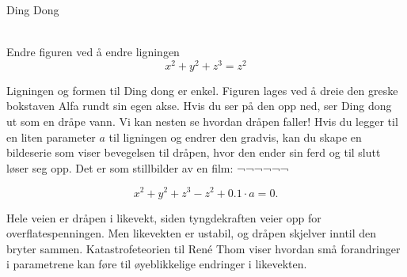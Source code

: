 \documentclass[no]{./../../common/SurferDesc}%
\begin{document}
\footnotesize

\begin{surferPage}
  \begin{surferTitle}Ding Dong\end{surferTitle}  \\
Endre figuren ved å endre ligningen\\

\smallskip
\[x^2	+ y^2	+ z^3	= z^2\]

\singlespacing
Ligningen og formen til Ding dong er enkel. Figuren lages ved å dreie den greske bokstaven Alfa rundt sin egen akse. Hvis du ser på den opp ned, ser Ding dong ut som en dråpe vann. Vi kan nesten se hvordan dråpen faller! 
\newline
Hvis du legger til en liten parameter $a$ til ligningen og endrer den gradvis, kan du skape en bildeserie som viser bevegelsen til dråpen, hvor den ender sin ferd og til slutt løser seg opp. Det er som stillbilder av en film:
¬¬¬¬¬¬

\[x^2	+ y^2	+ z^3	-z^2+0.1\cdot a=0.\]

Hele veien er dråpen i likevekt, siden tyngdekraften veier opp for overflatespenningen. Men likevekten er ustabil, og dråpen skjelver inntil den bryter sammen. Katastrofeteorien til René Thom viser hvordan små forandringer i parametrene kan føre til øyeblikkelige endringer i likevekten. 


  \begin{surferText}
     \end{surferText}
\end{surferPage}


\end{document}
